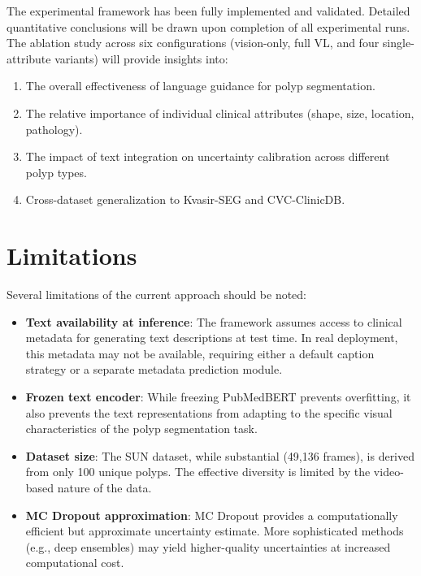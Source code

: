 The experimental framework has been fully implemented and validated. Detailed quantitative conclusions will be drawn upon completion of all experimental runs. The ablation study across six configurations (vision-only, full VL, and four single-attribute variants) will provide insights into:

\begin{enumerate}
	\item The overall effectiveness of language guidance for polyp segmentation.
	\item The relative importance of individual clinical attributes (shape, size, location, pathology).
	\item The impact of text integration on uncertainty calibration across different polyp types.
	\item Cross-dataset generalization to Kvasir-SEG and CVC-ClinicDB.
\end{enumerate}


\section{Limitations}
\label{sec:concl:limitations}

Several limitations of the current approach should be noted:

\begin{itemize}
	\item \textbf{Text availability at inference}: The framework assumes access to clinical metadata for generating text descriptions at test time. In real deployment, this metadata may not be available, requiring either a default caption strategy or a separate metadata prediction module.
	
	\item \textbf{Frozen text encoder}: While freezing PubMedBERT prevents overfitting, it also prevents the text representations from adapting to the specific visual characteristics of the polyp segmentation task.
	
	\item \textbf{Dataset size}: The SUN dataset, while substantial (49{,}136 frames), is derived from only 100 unique polyps. The effective diversity is limited by the video-based nature of the data.
	
	\item \textbf{MC Dropout approximation}: MC Dropout provides a computationally efficient but approximate uncertainty estimate. More sophisticated methods (e.g., deep ensembles) may yield higher-quality uncertainties at increased computational cost.
\end{itemize}


